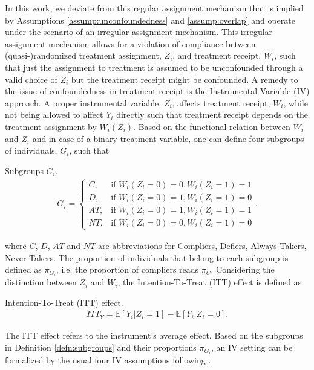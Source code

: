 In this work, we deviate from this regular assignment mechanism that is implied by Assumptions \ref{assump:unconfoundedness} and \ref{assump:overlap} and operate under the scenario of an irregular assignment mechanism.
This irregular assignment mechanism allows for a violation of compliance between (quasi-)randomized treatment assignment, $Z_i$, and treatment receipt, $W_i$, such that just the assignment to treatment is assumed to be unconfounded through a valid choice of $Z_i$ but the treatment receipt might be confounded.
A remedy to the issue of confoundedness in treatment receipt is the Instrumental Variable (IV) approach.
A proper instrumental variable, $Z_i$, affects treatment receipt, $W_i$, while not being allowed to affect $Y_i$ directly such that treatment receipt depends on the treatment assignment by $W_i(Z_i)$.
Based on the functional relation between $W_i$ and $Z_i$ and in case of a binary treatment variable, one can define four subgroups of individuals, $G_i$, such that  
\begin{defn}{Subgroups $G_i$.}
   \label{defn:subgroups}
   \begin{align*}
      G_i=
      \begin{cases}
         C,& \text{if } W_i(Z_i = 0) = 0, W_i(Z_i = 1) = 1 \\
         D,& \text{if } W_i(Z_i = 0) = 1, W_i(Z_i = 1) = 0 \\
         AT,& \text{if } W_i(Z_i = 0) = 1, W_i(Z_i = 1) = 1 \\
         NT,& \text{if }W_i(Z_i = 0) = 0, W_i(Z_i = 1) = 0
      \end{cases}.
   \end{align*}
\end{defn}
where $C$, $D$, $AT$ and $NT$ are abbreviations for Compliers, Defiers, Always-Takers, Never-Takers. 
The proportion of individuals that belong to each subgroup is defined as $\pi_{G_i}$, i.e. the proportion of compliers reads $\pi_{C}$.
Considering the distinction between $Z_i$ and $W_i$, the Intention-To-Treat (ITT) effect is defined as
\begin{defn}{Intention-To-Treat (ITT) effect.}
   \begin{align*}
      ITT_Y = \mathbb{E} \left[ Y_i | Z_i = 1 \right] - \mathbb{E} \left[ Y_i | Z_i = 0 \right].
   \end{align*}
\end{defn}
The ITT effect refers to the instrument's average effect. 
Based on the subgroups in Definition \ref{defn:subgroups} and their proportions $\pi_{G_i}$, an IV setting can be formalized by the usual four IV assumptions following \cite{Angrist1996}.

